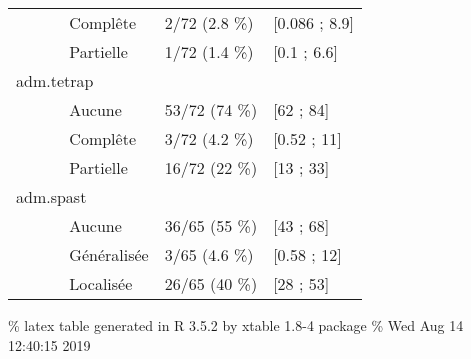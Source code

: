 \documentclass[]{article}
\begin{document}
\begin{longtable}{lll}
  ~~~~~~ Complête & 2/72 (2.8 \%) &  [0.086 ; 8.9] \\ 
  ~~~~~~ Partielle & 1/72 (1.4 \%) &  [0.1 ; 6.6] \\ 
  adm.tetrap &   &   \\ 
  ~~~~~~ Aucune & 53/72 (74 \%) &  [62 ; 84] \\ 
  ~~~~~~ Complête & 3/72 (4.2 \%) &  [0.52 ; 11] \\ 
  ~~~~~~ Partielle & 16/72 (22 \%) &  [13 ; 33] \\ 
  adm.spast &   &   \\ 
  ~~~~~~ Aucune & 36/65 (55 \%) &  [43 ; 68] \\ 
  ~~~~~~ Généralisée & 3/65 (4.6 \%) &  [0.58 ; 12] \\ 
  ~~~~~~ Localisée & 26/65 (40 \%) &  [28 ; 53] \\ 
  \end{longtable}

\% latex table generated in R 3.5.2 by xtable 1.8-4 package \% Wed Aug
14 12:40:15 2019
\end{document}
